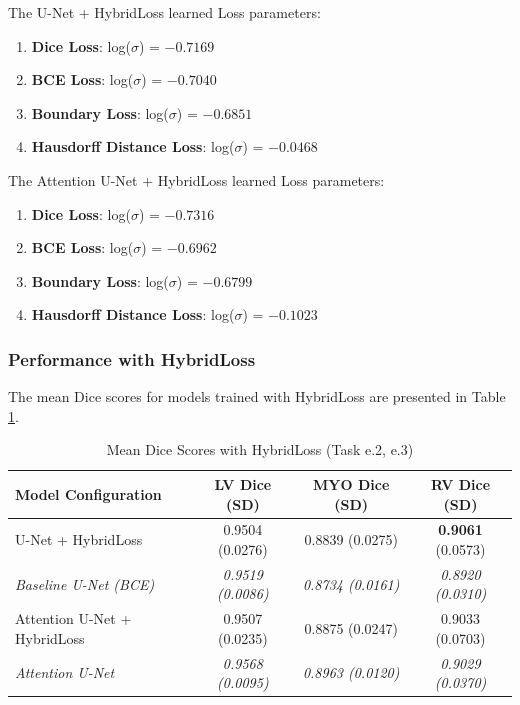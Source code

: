 \documentclass{article}
\begin{document}
The U-Net + HybridLoss learned Loss parameters:
\begin{enumerate}
  \item \textbf{Dice Loss}: log($\sigma$) = $-0.7169$
  \item \textbf{BCE Loss}: log($\sigma$) = $-0.7040$
  \item \textbf{Boundary Loss}: log($\sigma$) = $-0.6851$
  \item \textbf{Hausdorff Distance Loss}: log($\sigma$) = $-0.0468$
\end{enumerate}

The Attention U-Net + HybridLoss learned Loss parameters:
\begin{enumerate}
  \item \textbf{Dice Loss}: log($\sigma$) = $-0.7316$
  \item \textbf{BCE Loss}: log($\sigma$) = $-0.6962$
  \item \textbf{Boundary Loss}: log($\sigma$) = $-0.6799$
  \item \textbf{Hausdorff Distance Loss}: log($\sigma$) = $-0.1023$
\end{enumerate}
\subsubsection{Performance with HybridLoss}

The mean Dice scores for models trained with HybridLoss are presented in Table \ref{tab:hybridloss_results}.
\begin{table}[H]
  \centering
  \caption{Mean Dice Scores with HybridLoss (Task e.2, e.3)}
  \label{tab:hybridloss_results}
  \begin{tabular}{l|c|c|c}
    \toprule
    Model Configuration           & LV Dice (SD)             & MYO Dice (SD)            & RV Dice (SD)             \\
    \midrule
    U-Net + HybridLoss            & 0.9504 (0.0276)          & 0.8839 (0.0275)          & \textbf{0.9061} (0.0573) \\
    \textit{Baseline U-Net (BCE)} & \textit{0.9519 (0.0086)} & \textit{0.8734 (0.0161)} & \textit{0.8920 (0.0310)} \\
    \midrule
    Attention U-Net + HybridLoss  & 0.9507 (0.0235)          & 0.8875 (0.0247)          & 0.9033 (0.0703)          \\
    \textit{Attention U-Net}      & \textit{0.9568 (0.0095)} & \textit{0.8963 (0.0120)} & \textit{0.9029 (0.0370)} \\
    \bottomrule
  \end{tabular}
\end{table}
\end{document}
